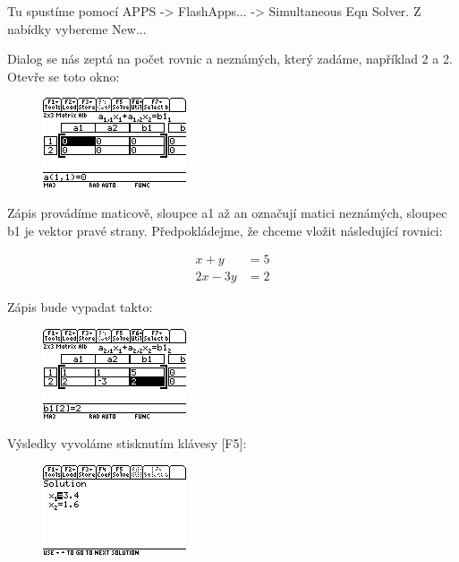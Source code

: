 \documentclass[10pt,a4paper,float]{article}
\begin{document}
Tu spustíme pomocí APPS -> FlashApps... -> Simultaneous Eqn Solver. Z nabídky vybereme New...

Dialog se nás zeptá na počet rovnic a neznámých, který zadáme, například 2 a 2. Otevře se toto okno:

\begin{figure}[H]
	\centering
	\includegraphics[width=.5\textwidth]{img/SYSEQ1}
\end{figure}

Zápis provádíme maticově, sloupce a1 až an označují matici neznámých, sloupec b1 je vektor pravé strany. Předpokládejme, že chceme vložit následující rovnici:

\begin{align*}
	x + y &= 5\\
	2x - 3y &= 2
\end{align*}

Zápis bude vypadat takto:

\begin{figure}[H]
	\centering
	\includegraphics[width=.5\textwidth]{img/SYSEQ2}
\end{figure}

\pagebreak

Výsledky vyvoláme stisknutím klávesy [F5]:

\begin{figure}[H]
	\centering
	\includegraphics[width=.5\textwidth]{img/SYSEQ3}
\end{figure}
\end{document}
